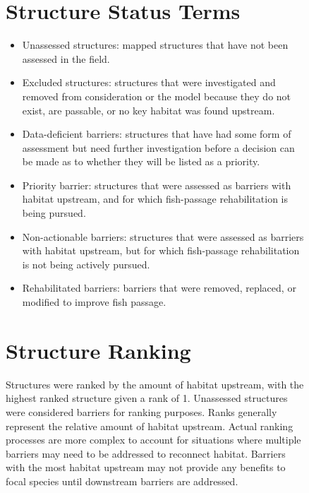 \documentclass[
  letterpaper,
  DIV=11,
  numbers=noendperiod]{scrreprt}
\begin{document}
\begin{figure}
{\section*{Structure Status Terms}\label{structure-status-terms-1}


\begin{itemize}
\item
  Unassessed structures: mapped structures that have not been assessed
  in the field.
\item
  Excluded structures: structures that were investigated and removed
  from consideration or the model because they do not exist, are
  passable, or no key habitat was found upstream.
\item
  Data-deficient barriers: structures that have had some form of
  assessment but need further investigation before a decision can be
  made as to whether they will be listed as a priority.
\item
  Priority barrier: structures that were assessed as barriers with
  habitat upstream, and for which fish-passage rehabilitation is being
  pursued.
\item
  Non-actionable barriers: structures that were assessed as barriers
  with habitat upstream, but for which fish-passage rehabilitation is
  not being actively pursued.
\item
  Rehabilitated barriers: barriers that were removed, replaced, or
  modified to improve fish passage.
\end{itemize}

\section*{Structure Ranking}\label{structure-ranking}


Structures were ranked by the amount of habitat upstream, with the
highest ranked structure given a rank of 1. Unassessed structures were
considered barriers for ranking purposes. Ranks generally represent the
relative amount of habitat upstream. Actual ranking processes are more
complex to account for situations where multiple barriers may need to be
addressed to reconnect habitat. Barriers with the most habitat upstream
may not provide any benefits to focal species until downstream barriers
are addressed.

}
\end{figure}
\end{document}

